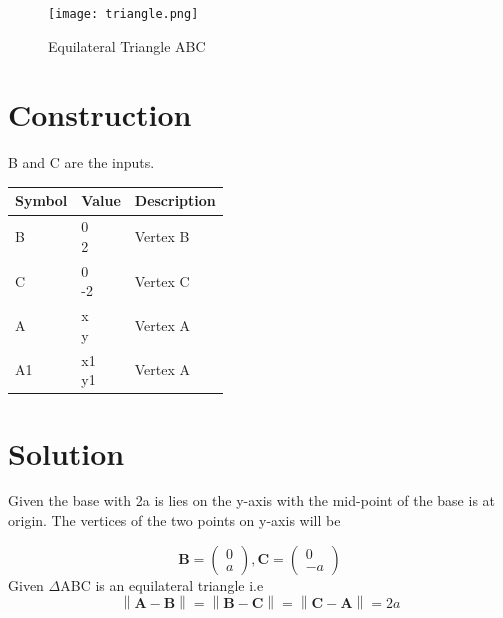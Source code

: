 \documentclass[journal,12pt,twocolumn]{IEEEtran}
\providecommand{\norm}[1]{\left\lVert#1\right\rVert}
\let\vec\mathbf
\newcommand{\myvec}[1]{\ensuremath{\begin{pmatrix}#1\end{pmatrix}}}
\begin{document}
\iffalse

\begin{figure}[h]
\texttt{[image: triangle.png]}
\caption{Equilateral Triangle ABC}
\label{fig:triangle}
\end{figure}

\section{Construction}
B and C are the inputs.
\begin{table}[h]
\centering
\large
\begin{tabular}{|l|l|l|}
\hline
\textbf{Symbol} & \textbf{Value} & \textbf{Description} \\ \hline
B               & \myvec{0 \\ 2}         & Vertex B             \\ \hline
C               & \myvec{0 \\ -2}        & Vertex C             \\ \hline
A               & \myvec{x \\ y}          & Vertex A             \\ \hline
A1              & \myvec{x1 \\ y1}       & Vertex A             \\ \hline
\end{tabular}
\end{table}

\section{Solution}
\noindent Given the base with 2a is lies on the y-axis with the mid-point of the base is at origin. The vertices of the two points on y-axis will be

\begin{equation}
\vec{B}=\begin{pmatrix} 
0\\
a
\end{pmatrix}, {
\vec{C}=\begin{pmatrix} 
0\\
-a
\end{pmatrix} }
\end{equation}
\noindent Given $\Delta$ABC is an equilateral triangle i.e 
\begin{equation}
 \norm{\vec{A}-\vec{B}}= \norm{\vec{B}-\vec{C}}= \norm{\vec{C}-\vec{A}} =2a
\end{equation}
\end{document}
